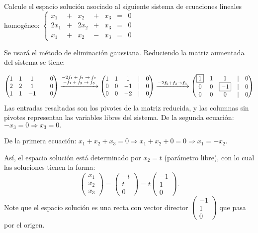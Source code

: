 \begin{example} Calcule el espacio solución asociado al siguiente sistema de ecuaciones lineales homogéneo: \(\left\lbrace \begin{array}{ccccccc}
x_1&+&x_2&+&x_3&=&0\\
2x_1&+&2x_2&+&x_3&=&0\\
x_1&+&x_2&-&x_3&=&0
\end{array} \right. \)
\begin{myproof} Se usará el método de eliminación gaussiana. Reduciendo la matriz aumentada del sistema se tiene:

\[\begin{pmatrix}
1&1&1&|&0\\
2&2&1&|&0\\
1&1&-1&|&0
\end{pmatrix}\xrightarrow{\begin{scriptsize}
\begin{matrix}
-2f_1+f_2 \rightarrow f_2\\ -f_1+f_3 \rightarrow f_3
\end{matrix}\end{scriptsize}}\begin{pmatrix}
1 & 1 & 1 & |& 0 \\
0 & 0 & -1 & |&0 \\
0 & 0 & -2 &|& 0
\end{pmatrix} \xrightarrow{-2f_2+f_3 \rightarrow f_3}\begin{pmatrix}
\boxed{1} & 1 & 1 & |& 0 \\
0 & 0 & \boxed{-1} & |&0 \\
0 & 0 & 0 &|& 0
\end{pmatrix}\]
Las entradas resaltadas son los pivotes de la matriz reducida, y las columnas sin pivotes representan las variables libres del sistema. De la segunda ecuación: $-x_3=0 \Rightarrow x_3=0.$ 

De la primera ecuación: $x_1+x_2+x_3=0\Rightarrow x_1+x_2+0=0\Rightarrow x_1=-x_2.$


Así, el espacio solución está determinado por $x_2=t$ (parámetro libre), con lo cual las soluciones tienen la forma: $$\begin{pmatrix} x_1\\x_2\\x_3 \end{pmatrix} = \begin{pmatrix} -t\\t\\0 \end{pmatrix} = t\begin{pmatrix} -1\\1\\0 \end{pmatrix}.$$ 
Note que el espacio solución es una recta con vector director $\begin{pmatrix} -1\\1\\0 \end{pmatrix}$ que pasa por el origen.
\end{myproof}
\end{example}

